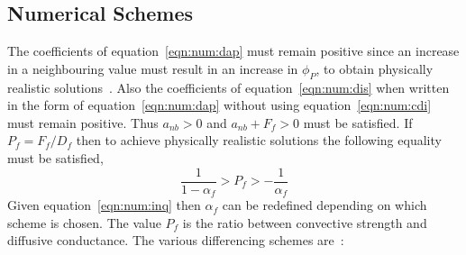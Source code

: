 \subsection{Numerical Schemes}

The coefficients of equation~\eqref{eqn:num:dap} must remain positive since
an increase in a neighbouring value must result in an increase in $\phi_P$,
to obtain physically realistic solutions~\cite{patankar}. Also the coefficients of
equation~\eqref{eqn:num:dis} when written in the form of equation~\eqref{eqn:num:dap}
without using equation~\eqref{eqn:num:cdi} must remain positive.
Thus $a_{nb}>0$ and $a_{nb} + F_f>0$ must be satisfied.
If $P_f=F_f/D_f$
then to achieve physically realistic solutions the following
equality must be satisfied,
\begin{equation}
\frac{1}{1-\alpha_f} > P_f > -\frac{1}{\alpha_f}
\label{eqn:num:inq}
\end{equation}
Given equation~\eqref{eqn:num:inq} then $\alpha_f$ can be redefined depending
on which scheme is chosen. The value $P_f$ is the ratio between
convective strength and diffusive conductance. The various differencing schemes
are~\cite{croftphd}:

